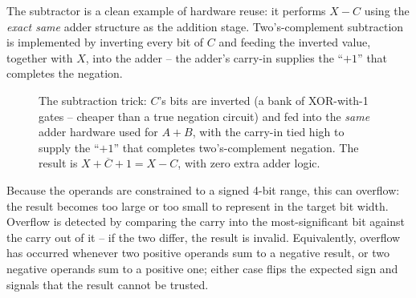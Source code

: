 \documentclass[11pt, a4paper]{article}
\newcommand{\sig}[1]{\texttt{#1}}
\begin{document}
The subtractor is a clean example of hardware reuse: it performs
$X - C$ using the \emph{exact same} adder structure as the addition stage.
Two's-complement subtraction is implemented by inverting every bit of $C$
and feeding the inverted value, together with $X$, into the adder -- the
adder's carry-in supplies the ``$+1$'' that completes the negation.

\begin{figure}[H]
\centering
{}
\caption{The subtraction trick: $C$'s bits are inverted (a bank of XOR-with-1
gates -- cheaper than a true negation circuit) and fed into the
\emph{same} adder hardware used for $A+B$, with the carry-in tied high to
supply the ``$+1$'' that completes two's-complement negation. The result is
$X + \overline{C} + 1 = X - C$, with zero extra adder logic.}
\label{fig:subtractor-reuse}
\end{figure}

Because the operands are constrained to a signed 4-bit range, this can
overflow: the result becomes too large or too small to represent in the
target bit width. Overflow is detected by comparing the carry into the
most-significant bit against the carry out of it -- if the two differ, the
result is invalid. Equivalently, overflow has occurred whenever two
positive operands sum to a negative result, or two negative operands sum to
a positive one; either case flips the expected sign and signals that the
result cannot be trusted.
\end{document}
